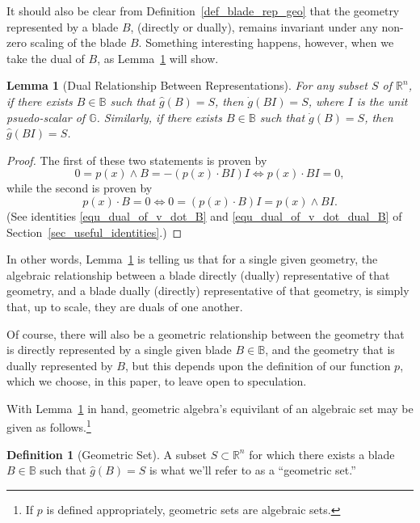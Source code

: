 \documentclass{birkjour}
\newtheorem{lem}[thm]{Lemma}
\theoremstyle{definition}
\newtheorem{defn}[thm]{Definition}
\theoremstyle{remark}
\numberwithin{equation}{section}
\newcommand{\R}{\mathbb{R}}
\newcommand{\B}{\mathbb{B}}
\newcommand{\G}{\mathbb{G}}
\newcommand{\gd}{\dot{g}}
\newcommand{\gh}{\hat{g}}
\begin{document}
It should also be clear from Definition~\ref{def_blade_rep_geo} that the geometry represented by a blade $B$, (directly or dually), remains invariant
under any non-zero scaling of the blade $B$.  Something interesting happens, however, when we take the dual of $B$, as Lemma~\ref{lem_dual_rep} will show.

\begin{lem}[Dual Relationship Between Representations]\label{lem_dual_rep}
For any subset $S$ of $\R^n$, if there exists $B\in\B$ such that $\gh(B)=S$, then $\gd(BI)=S$, where
$I$ is the unit psuedo-scalar of $\G$.  Similarly, if there exists $B\in\B$ such that $\gd(B)=S$, then $\gh(BI)=S$.
\end{lem}
\begin{proof}
The first of these two statements is proven by
\begin{equation*}
0=p(x)\wedge B=-(p(x)\cdot BI)I\iff p(x)\cdot BI=0,
\end{equation*}
while the second is proven by
\begin{equation*}
p(x)\cdot B=0\iff 0=(p(x)\cdot B)I=p(x)\wedge BI.
\end{equation*}
(See identities \eqref{equ_dual_of_v_dot_B} and \eqref{equ_dual_of_v_dot_dual_B} of Section~\ref{sec_useful_identities}.)
\end{proof}

In other words, Lemma~\ref{lem_dual_rep} is telling us that for a single given geometry, the algebraic relationship between a
blade directly (dually) representative of that geometry, and a blade dually (directly) representative of that geometry, is simply
that, up to scale, they are duals of one another.

Of course, there will also be a geometric relationship between the geometry that is directly represented by a single given
blade $B\in\B$, and the geometry that is dually represented by $B$, but this depends upon the definition of our function
$p$, which we choose, in this paper, to leave open to speculation.

With Lemma~\ref{lem_dual_rep} in hand, geometric algebra's equivilant of an algebraic set may be given as follows.\footnote{If $p$ is
defined appropriately, geometric sets are algebraic sets.}

\begin{defn}[Geometric Set]\label{def_geo_set}
A subset $S\subset\R^n$ for which there exists a blade $B\in\B$ such that $\gh(B)=S$ is what we'll refer to as a ``geometric set.''
\end{defn}
\end{document}
